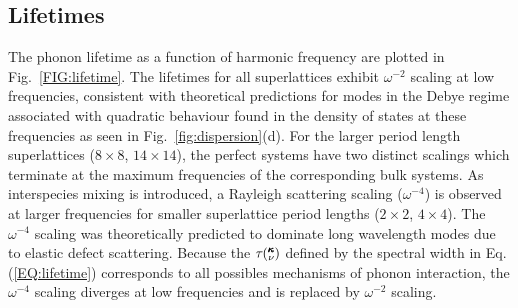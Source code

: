\documentclass[aps,prb,preprint,preprintnumbers,amsmath,amssymb,floatfix,superscriptaddress]{revtex4}
\newcommand{\kv}{\mspace{-4.0mu}\left(\mspace{-8.0mu}
\begin{smallmatrix}&\pmb{\kappa} \\&\nu\end{smallmatrix}
\mspace{-3.0mu}\right)}
\begin{document}


\subsection{Lifetimes}

The phonon lifetime as a function of harmonic frequency are plotted in Fig.~\ref{FIG:lifetime}. The lifetimes for all superlattices exhibit $\omega^{-2}$ scaling at low frequencies, consistent with theoretical predictions for modes in the Debye regime associated with quadratic behaviour found in the density of states at these frequencies as seen in Fig.~\ref{fig:dispersion}(d).\cite{Klemens_Thermal_1951} For the larger period length superlattices ($8\times8$, $14\times14$), the perfect systems have two distinct scalings which terminate at the maximum frequencies of the corresponding bulk systems. As interspecies mixing is introduced, a Rayleigh scattering scaling ($\omega^{-4}$) is observed at larger frequencies for smaller superlattice period lengths ($2\times2$, $4\times4$). The $\omega^{-4}$ scaling was theoretically predicted to dominate long wavelength modes due to elastic defect scattering.\cite{PhysRev.140.A1812,klemens_scattering_1955-3, klemens_thermal_1957-2} Because the $\tau\kv$ defined by the spectral width in Eq.(\ref{EQ:lifetime}) corresponds to all possibles mechanisms of phonon interaction, the $\omega^{-4}$ scaling diverges at low frequencies and is replaced by $\omega^{-2}$ scaling. 
\end{document}
